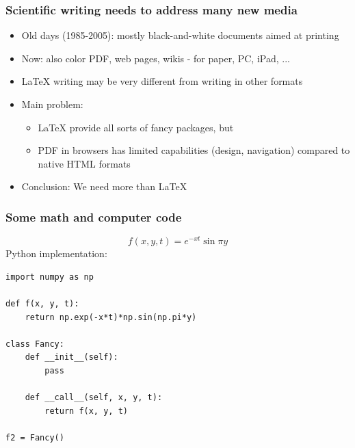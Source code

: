 \documentclass{beamer}
\begin{document}
\begin{frame}
\frametitle{Scientific writing needs to address many new media}

\begin{itemize}
 \item<2-> Old days (1985-2005): mostly black-and-white documents aimed at printing

 \item<3-> Now: also color PDF, web pages, wikis - for paper, PC, iPad, ...

 \item<4-> {\LaTeX} writing may be very different from writing in other formats

 \item<5-> Main problem:
\begin{itemize}

    \item<6-> {\LaTeX} provide all sorts of fancy packages, but

    \item<7-> PDF in browsers has limited capabilities (design, navigation)
      compared to native HTML formats

\end{itemize}

\noindent
 \item<8-> Conclusion: We need more than {\LaTeX}
\end{itemize}

\noindent
\end{frame}

\begin{frame}
\frametitle{Some math and computer code}

\[ f(x,y,t) = e^{-xt}\sin\pi y \]
Python implementation:

\begin{Verbatim}[numbers=none,fontsize=\fontsize{9pt}{9pt},baselinestretch=0.95]
import numpy as np

def f(x, y, t):
    return np.exp(-x*t)*np.sin(np.pi*y)

class Fancy:
    def __init__(self):
        pass

    def __call__(self, x, y, t):
        return f(x, y, t)

f2 = Fancy()
\end{Verbatim}
\end{frame}
\end{document}
